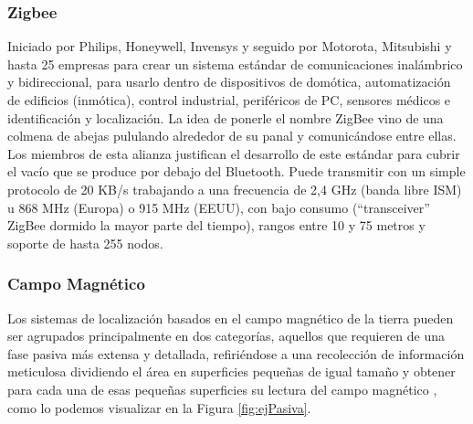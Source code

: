 \subsubsection{Zigbee}

Iniciado por Philips, Honeywell, Invensys y seguido por Motorota, Mitsubishi y hasta 25 empresas para crear un sistema estándar de comunicaciones inalámbrico y bidireccional, para usarlo dentro de dispositivos de domótica, automatización de edificios (inmótica), control industrial, periféricos de PC, sensores médicos e identificación y localización. La idea de ponerle el nombre ZigBee vino de una colmena de abejas pululando alrededor de su panal y comunicándose entre ellas.
Los miembros de esta alianza justifican el desarrollo de este estándar para cubrir el vacío que se produce por debajo del Bluetooth. Puede transmitir con un simple protocolo de 20 KB/s trabajando a una frecuencia de 2,4 GHz (banda libre ISM) u 868 MHz (Europa) o 915 MHz (EEUU), con bajo consumo (“transceiver” ZigBee dormido la mayor parte del tiempo), rangos entre 10 y 75 metros y soporte de hasta 255 nodos. 

\subsubsection{Campo Magnético}

Los sistemas de localización basados en el campo magnético de la tierra pueden ser agrupados principalmente en dos categorías, aquellos que requieren de una fase pasiva más extensa y detallada, refiriéndose a una recolección de información meticulosa dividiendo el área en superficies pequeñas de igual tamaño y obtener para cada una de esas pequeñas superficies su lectura del campo magnético \cite{usoCampoMagnetico}, como lo podemos visualizar en la Figura \ref{fig:ejPasiva}.

